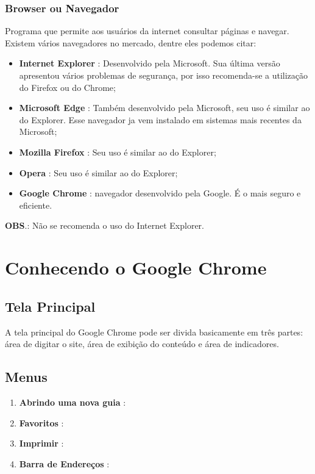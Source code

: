 \documentclass[hidelinks,12pt]{article}
\begin{document}
		\subsubsection{Browser ou Navegador}
		Programa que permite aos usuários da internet consultar páginas e navegar. Existem vários navegadores no mercado, dentre eles podemos citar:
			\begin{itemize}
				\item \textbf{Internet Explorer} : Desenvolvido pela Microsoft. Sua última versão apresentou vários problemas de segurança, por isso recomenda-se a utilização do Firefox ou do Chrome;
				\item \textbf{Microsoft Edge} : Também desenvolvido pela Microsoft, seu uso é similar ao do Explorer. Esse navegador ja vem instalado em sistemas mais recentes da Microsoft;
				\item \textbf{Mozilla Firefox} : Seu uso é similar ao do Explorer;
				\item \textbf{Opera} : Seu uso é similar ao do Explorer;
				\item \textbf{Google Chrome} : navegador desenvolvido pela Google. É o mais seguro e eficiente.
			\end{itemize}
			\textbf{OBS}.: Não se recomenda o uso do Internet Explorer.
		
		\section{Conhecendo o Google Chrome}
			\subsection{Tela Principal}
			A tela principal do Google Chrome pode ser divida basicamente em três partes: área de digitar o site, área de exibição do conteúdo e área de indicadores.
		
			\subsection{Menus}
			
			\begin{enumerate}
				\item \textbf{Abrindo uma nova guia} :
				\item \textbf{Favoritos} :
				\item \textbf{Imprimir} :
				\item \textbf{Barra de Endereços} :
			\end{enumerate}
			
\end{document}
